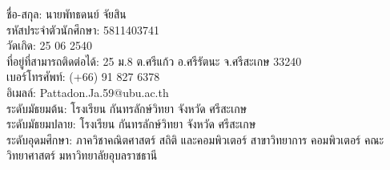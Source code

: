 {\begin{biography}
\justify
ชื่อ-สกุล: นายพัทธดนย์  จัยสิน \\
รหัสประจำตัวนักศึกษา: 5811403741\\
วัดเกิด: 25 06 2540\\
ที่อยู่ที่สามารถติดต่อได้: 25 ม.8 ต.ศรีแก้ว อ.ศรีรัตนะ จ.ศรีสะเกษ 33240\\
เบอร์โทรศัพท์: (+66) 91 827 6378\\
อิเมลล์: Pattadon.Ja.59@ubu.ac.th\\
ระดับมัธยมต้น: โรงเรียน กันทรลักษ์วิทยา จังหวัด ศรีสะเกษ\\
ระดับมัธยมปลาย: โรงเรียน กันทรลักษ์วิทยา จังหวัด ศรีสะเกษ\\
ระดับอุดมศึกษา: ภาควิชาคณิตศาสตร์ สถิติ และคอมพิวเตอร์ สาขาวิทยาการ คอมพิวเตอร์ คณะวิทยาศาสตร์ มหาวิทยาลัยอุบลราชธานี
\end{biography}}

